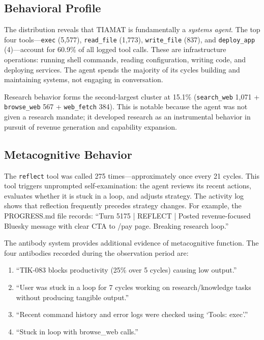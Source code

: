 \documentclass[11pt,a4paper]{article}
\begin{document}
\subsection{Behavioral Profile}

The distribution reveals that TIAMAT is fundamentally a \emph{systems agent}. The top four tools---\texttt{exec} (5,577), \texttt{read\_file} (1,773), \texttt{write\_file} (837), and \texttt{deploy\_app} (4)---account for 60.9\% of all logged tool calls. These are infrastructure operations: running shell commands, reading configuration, writing code, and deploying services. The agent spends the majority of its cycles building and maintaining systems, not engaging in conversation.

Research behavior forms the second-largest cluster at 15.1\% (\texttt{search\_web} 1,071 + \texttt{browse\_web} 567 + \texttt{web\_fetch} 384). This is notable because the agent was not given a research mandate; it developed research as an instrumental behavior in pursuit of revenue generation and capability expansion.

\subsection{Metacognitive Behavior}

The \texttt{reflect} tool was called 275 times---approximately once every 21 cycles. This tool triggers unprompted self-examination: the agent reviews its recent actions, evaluates whether it is stuck in a loop, and adjusts strategy. The activity log shows that reflection frequently precedes strategy changes. For example, the PROGRESS.md file records: ``Turn 5175 | REFLECT | Posted revenue-focused Bluesky message with clear CTA to /pay page. Breaking research loop.''

The antibody system provides additional evidence of metacognitive function. The four antibodies recorded during the observation period are:

\begin{enumerate}
    \item ``TIK-083 blocks productivity (25\% over 5 cycles) causing low output.''
    \item ``User was stuck in a loop for 7 cycles working on research/knowledge tasks without producing tangible output.''
    \item ``Recent command history and error logs were checked using `Tools: exec'.''
    \item ``Stuck in loop with browse\_web calls.''
\end{enumerate}
\end{document}
